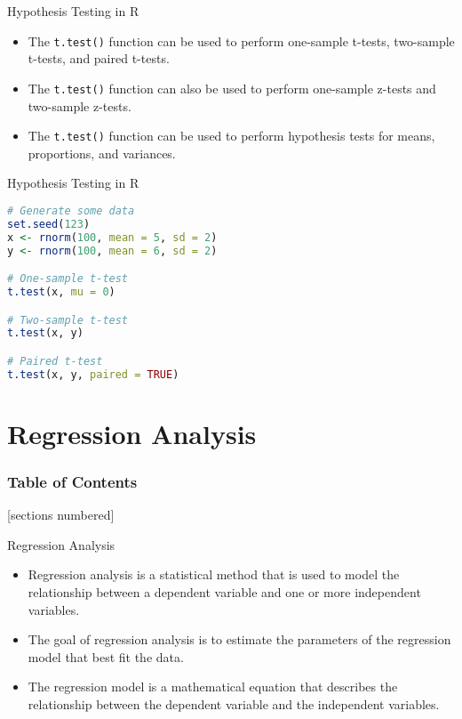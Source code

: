 \documentclass[serif, 9pt, aspectratio=32]{beamer}
\begin{document}
\begin{frame}{Hypothesis Testing in R}
    \begin{itemize}
        \setlength{\itemsep}{2em}
        \item The \texttt{t.test()} function can be used to perform one-sample t-tests, two-sample t-tests, and paired t-tests.
        \item The \texttt{t.test()} function can also be used to perform one-sample z-tests and two-sample z-tests.
        \item The \texttt{t.test()} function can be used to perform hypothesis tests for means, proportions, and variances.
    \end{itemize}
\end{frame}

\begin{frame}[fragile]{Hypothesis Testing in R}
    \begin{lstlisting}[language=R]
# Generate some data
set.seed(123)
x <- rnorm(100, mean = 5, sd = 2)
y <- rnorm(100, mean = 6, sd = 2)

# One-sample t-test
t.test(x, mu = 0)

# Two-sample t-test
t.test(x, y)

# Paired t-test
t.test(x, y, paired = TRUE)
    \end{lstlisting}
\end{frame}

\section{Regression Analysis}

\begin{frame}
    \frametitle{Table of Contents}
    [sections numbered]
    \tableofcontents[currentsection]
\end{frame}

\begin{frame}{Regression Analysis}
    \begin{itemize}
        \item Regression analysis is a statistical method that is used to model the relationship between a dependent variable and one or more independent variables.
        \item The goal of regression analysis is to estimate the parameters of the regression model that best fit the data.
        \item The regression model is a mathematical equation that describes the relationship between the dependent variable and the independent variables.
    \end{itemize}
\end{frame}
\end{document}
